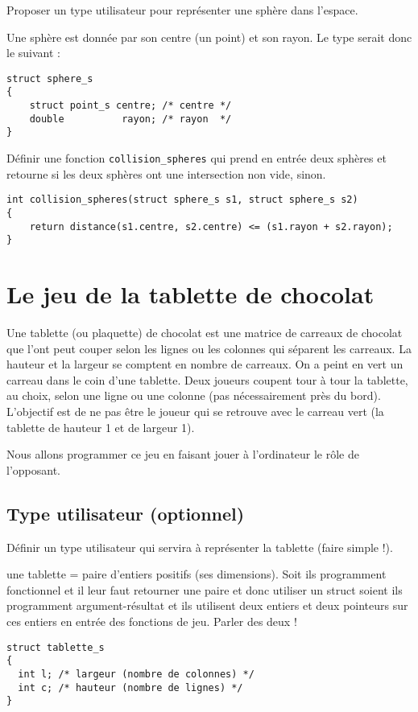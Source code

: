 \begin{lastenu}
\item Proposer un type utilisateur pour représenter une sphère dans
  l'espace.
  \begin{correction}
Une sphère est donnée par son centre (un point) et son rayon. Le type serait donc le suivant :
\begin{verbatim}
struct sphere_s
{
    struct point_s centre; /* centre */
    double          rayon; /* rayon  */
}
\end{verbatim}
\end{correction}
\item Définir une fonction \verb+collision_spheres+ qui prend en
  entrée deux sphères et retourne  si les deux sphères ont une
  intersection non vide,  sinon.
  \begin{correction}
\begin{verbatim}
int collision_spheres(struct sphere_s s1, struct sphere_s s2)
{
    return distance(s1.centre, s2.centre) <= (s1.rayon + s2.rayon);
}
\end{verbatim}
\end{correction}
\end{lastenu}


\section{Le jeu de la tablette de chocolat}

Une tablette (ou plaquette) de chocolat est une matrice de carreaux de
chocolat que l'ont peut couper selon les lignes ou les colonnes qui
séparent les carreaux. La hauteur et la largeur se comptent en nombre
de carreaux. On a peint en vert un carreau dans le coin d'une
tablette. Deux joueurs coupent tour à tour la tablette, au choix,
selon une ligne ou une colonne (pas nécessairement près du
bord). L'objectif est de ne pas être le joueur qui se retrouve avec le
carreau vert (la tablette de hauteur 1 et de largeur 1).

Nous allons programmer ce jeu en faisant jouer à l'ordinateur le rôle
de l'opposant.

\subsection{Type utilisateur (optionnel)}

Définir un type utilisateur qui servira à représenter la tablette
(faire simple !).

\begin{correction}
une tablette = paire d'entiers positifs (ses dimensions).
Soit ils programment fonctionnel et il leur faut retourner une paire
et donc utiliser un struct soient ils programment argument-résultat et
ils utilisent deux entiers et deux pointeurs sur ces entiers en entrée
des fonctions de jeu. Parler des deux !
\begin{verbatim}
struct tablette_s
{
  int l; /* largeur (nombre de colonnes) */
  int c; /* hauteur (nombre de lignes) */
}
\end{verbatim}
\end{correction}

